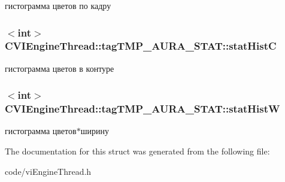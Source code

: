 гистограмма цветов по кадру 

\hypertarget{struct_c_v_i_engine_thread_1_1tag_t_m_p___a_u_r_a___s_t_a_t_aba2ac6a4a2f4096c664860c7e600b890}{
\subsubsection[{stat\+Hist\+C}]{$<$int$>$ C\+V\+I\+Engine\+Thread\+::tag\+T\+M\+P\+\_\+\+A\+U\+R\+A\+\_\+\+S\+T\+A\+T\+::stat\+Hist\+C}}\label{struct_c_v_i_engine_thread_1_1tag_t_m_p___a_u_r_a___s_t_a_t_aba2ac6a4a2f4096c664860c7e600b890}


гистограмма цветов в контуре 

\hypertarget{struct_c_v_i_engine_thread_1_1tag_t_m_p___a_u_r_a___s_t_a_t_a0bb0bffd8702d64bca468c48409afc4d}{
\subsubsection[{stat\+Hist\+W}]{$<$int$>$ C\+V\+I\+Engine\+Thread\+::tag\+T\+M\+P\+\_\+\+A\+U\+R\+A\+\_\+\+S\+T\+A\+T\+::stat\+Hist\+W}}\label{struct_c_v_i_engine_thread_1_1tag_t_m_p___a_u_r_a___s_t_a_t_a0bb0bffd8702d64bca468c48409afc4d}


гистограмма цветов$\ast$ширину 



The documentation for this struct was generated from the following file\+:\begin{DoxyCompactItemize}
\item 
code/vi\+Engine\+Thread.\+h\end{DoxyCompactItemize}
